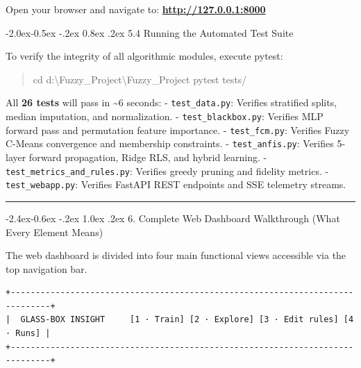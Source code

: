 \documentclass[10pt,a4paper]{article}
\makeatletter
\renewcommand\subsection{\@startsection{subsection}{2}{\z@}%
                                     {-2.4ex\@plus -0.6ex \@minus -.2ex}%
                                     {1.0ex \@plus .2ex}%
                                     {\normalfont\large\bfseries\color{primary}}}
\renewcommand\subsubsection{\@startsection{subsubsection}{3}{\z@}%
                                     {-2.0ex\@plus -0.5ex \@minus -.2ex}%
                                     {0.8ex \@plus .2ex}%
                                     {\normalfont\normalsize\bfseries\color{accent}}}
\newenvironment{Shaded}{\begin{quote}\small}{\end{quote}}
\newcommand{\FunctionTok}[1]{\textcolor[rgb]{0.02,0.16,0.49}{#1}}
\newcommand{\NormalTok}[1]{#1}
\newcommand{\OperatorTok}[1]{\textcolor[rgb]{0.40,0.40,0.40}{#1}}
\makeatother
\begin{document}
Open your browser and navigate to: \textbf{\url{http://127.0.0.1:8000}}

\subsubsection{5.4 Running the Automated Test
Suite}\label{running-the-automated-test-suite}

To verify the integrity of all algorithmic modules, execute pytest:

\begin{Shaded}
\begin{Highlighting}[]
\FunctionTok{cd}\NormalTok{ d}\OperatorTok{:}\NormalTok{\textbackslash{}Fuzzy\_Project\textbackslash{}Fuzzy\_Project}
\NormalTok{pytest tests}\OperatorTok{/}
\end{Highlighting}
\end{Shaded}

All \textbf{26 tests} will pass in \textasciitilde6 seconds: -
\texttt{test\_data.py}: Verifies stratified splits, median imputation,
and normalization. - \texttt{test\_blackbox.py}: Verifies MLP forward
pass and permutation feature importance. - \texttt{test\_fcm.py}:
Verifies Fuzzy C-Means convergence and membership constraints. -
\texttt{test\_anfis.py}: Verifies 5-layer forward propagation, Ridge
RLS, and hybrid learning. - \texttt{test\_metrics\_and\_rules.py}:
Verifies greedy pruning and fidelity metrics. -
\texttt{test\_webapp.py}: Verifies FastAPI REST endpoints and SSE
telemetry streams.

\begin{center}\rule{0.5\linewidth}{0.5pt}\end{center}

\subsection{6. Complete Web Dashboard Walkthrough (What Every Element
Means)}\label{complete-web-dashboard-walkthrough-what-every-element-means}

The web dashboard is divided into four main functional views accessible
via the top navigation bar.

\begin{verbatim}
+------------------------------------------------------------------------------+
|  GLASS-BOX INSIGHT     [1 · Train] [2 · Explore] [3 · Edit rules] [4 · Runs] |
+------------------------------------------------------------------------------+
\end{verbatim}
\end{document}
